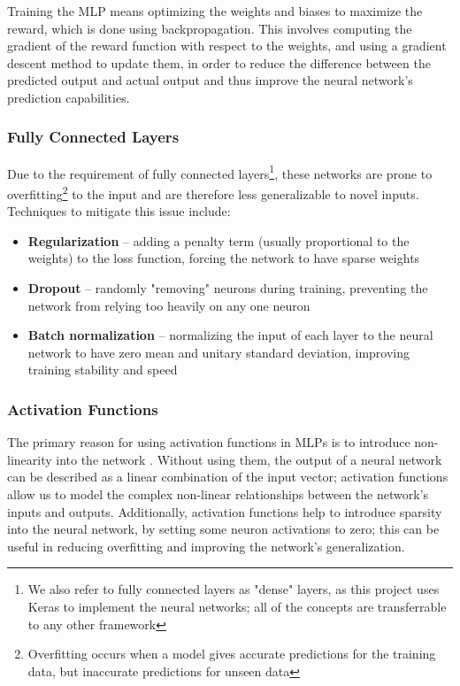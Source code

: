 Training the MLP means optimizing the weights and biases to maximize the
reward, which is done using backpropagation. This involves computing the
gradient of the reward function with respect to the weights, and using a
gradient descent method to update them, in order to reduce the difference
between the predicted output and actual output and thus improve the neural
network's prediction capabilities.

\subsubsection{Fully Connected Layers} \label{sec:connected_layers}

Due to the requirement of fully connected layers\footnote{We also refer to
  fully connected layers as "dense" layers, as this project uses Keras to
  implement the neural networks; all of the concepts are transferrable to any
  other framework}, these networks are prone to overfitting\footnote{Overfitting
  occurs when a model gives accurate predictions for the training data, but
  inaccurate predictions for unseen data} to the input and are therefore less
generalizable to novel inputs. Techniques to mitigate this issue include:

\begin{itemize}
  \item \textbf{Regularization} -- adding a penalty term (usually proportional to the weights) to the loss function, forcing the network to have sparse weights \cite{krogh1991simple}
  \item \textbf{Dropout} -- randomly "removing" neurons during training, preventing the network from relying too heavily on any one neuron \cite{srivastava2014dropout}
  \item \textbf{Batch normalization} -- normalizing the input of each layer to the neural network to have zero mean and unitary standard deviation, improving training stability and speed \cite{ioffe2015batch}
\end{itemize}

\subsubsection{Activation Functions} \label{sec:activation_functions}

The primary reason for using activation functions in MLPs is to introduce
non-linearity into the network \cite{sharma2017activation}. Without using them,
the output of a neural network can be described as a linear combination of the
input vector; activation functions allow us to model the complex non-linear
relationships between the network's inputs and outputs. Additionally,
activation functions help to introduce sparsity into the neural network, by
setting some neuron activations to zero; this can be useful in reducing
overfitting and improving the network's generalization.

